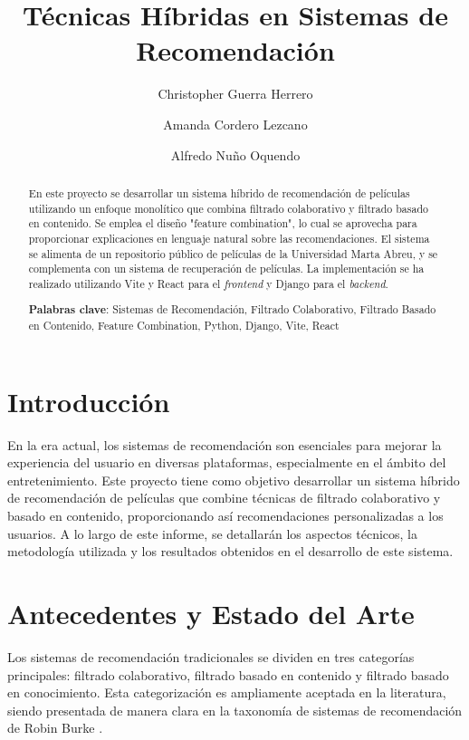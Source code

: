 \documentclass{llncs}
\begin{document}
	
	\title{Técnicas Híbridas en Sistemas de Recomendación}
	\author{Christopher Guerra Herrero \and Amanda Cordero Lezcano \and Alfredo Nuño Oquendo}
	
	\maketitle
	
	\begin{abstract}
		En este proyecto se desarrollar un sistema híbrido de recomendación de películas utilizando un enfoque monolítico que combina filtrado colaborativo y filtrado basado en contenido. Se emplea el diseño "feature combination", lo cual se aprovecha para proporcionar explicaciones en lenguaje natural sobre las recomendaciones. El sistema se alimenta de un repositorio público de películas de la Universidad Marta Abreu, y se complementa con un sistema de recuperación de películas. La implementación se ha realizado utilizando Vite y React para el 	\textit{frontend} y Django para el 	\textit{backend}. 
		
		\textbf{Palabras clave}: Sistemas de Recomendación, Filtrado Colaborativo, Filtrado Basado en Contenido, Feature Combination, Python, Django, Vite, React
	\end{abstract}
	
	\section{Introducción}
	En la era actual, los sistemas de recomendación son esenciales para mejorar la experiencia del usuario en diversas plataformas, especialmente en el ámbito del entretenimiento. Este proyecto tiene como objetivo desarrollar un sistema híbrido de recomendación de películas que combine técnicas de filtrado colaborativo y basado en contenido, proporcionando así recomendaciones personalizadas a los usuarios. A lo largo de este informe, se detallarán los aspectos técnicos, la metodología utilizada y los resultados obtenidos en el desarrollo de este sistema.
	
	\section{Antecedentes y Estado del Arte}
	Los sistemas de recomendación tradicionales se dividen en tres categorías principales: filtrado colaborativo, filtrado basado en contenido y filtrado basado en conocimiento. Esta categorización es ampliamente aceptada en la literatura, siendo presentada de manera clara en la taxonomía de sistemas de recomendación de Robin Burke \cite{burke2002hybrid}. 
	
\end{document}
